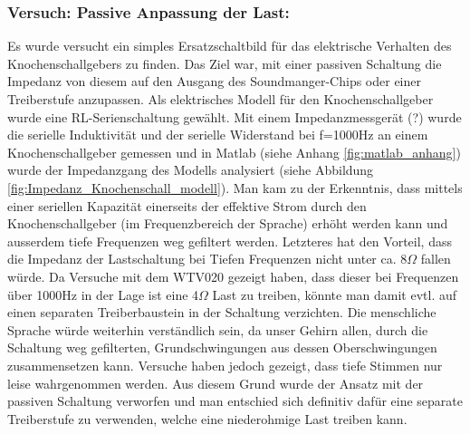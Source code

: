   
  \clearpage
  
  \subsubsection{Versuch: Passive Anpassung der Last:}
  Es wurde versucht ein simples Ersatzschaltbild für das elektrische Verhalten des Knochenschallgebers zu finden. 
  Das Ziel war, mit einer passiven Schaltung die Impedanz von diesem auf den Ausgang des Soundmanger-Chips oder einer Treiberstufe anzupassen. 
  Als elektrisches Modell für den Knochenschallgeber wurde eine RL-Serienschaltung gewählt. 
  Mit einem Impedanzmessgerät (?) wurde die serielle Induktivität und der serielle Widerstand bei f=1000Hz an einem Knochenschallgeber gemessen und in Matlab (siehe Anhang \ref{fig:matlab_anhang}) wurde der Impedanzgang des Modells analysiert (siehe Abbildung \ref{fig:Impedanz_Knochenschall_modell}). 
  Man kam zu der Erkenntnis, dass mittels einer seriellen Kapazität einerseits der effektive Strom durch den Knochenschallgeber (im Frequenzbereich der Sprache) erhöht werden kann und ausserdem tiefe Frequenzen weg gefiltert werden. 
  Letzteres hat den Vorteil, dass die Impedanz der Lastschaltung bei Tiefen Frequenzen nicht unter ca. 8\(\Omega\) fallen würde. Da Versuche mit dem WTV020 gezeigt haben, dass dieser bei Frequenzen über 1000Hz in der Lage ist eine 4\(\Omega\) Last zu treiben,
   könnte man damit evtl. auf einen separaten Treiberbaustein in der Schaltung verzichten. 
  Die menschliche Sprache würde weiterhin verständlich sein, da unser Gehirn allen, durch die Schaltung weg gefilterten, Grundschwingungen aus dessen Oberschwingungen zusammensetzen kann. 
  Versuche haben jedoch gezeigt, dass tiefe Stimmen nur leise wahrgenommen werden. 
  Aus diesem Grund wurde der Ansatz mit der passiven Schaltung verworfen und man entschied sich definitiv dafür eine separate Treiberstufe zu verwenden, welche eine niederohmige Last treiben kann.
  
